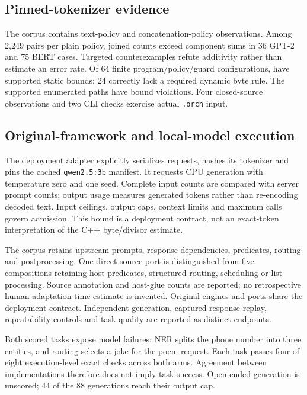 \documentclass[preprint,12pt,a4paper]{elsarticle}
\begin{document}
\subsection{Pinned-tokenizer evidence}
The corpus contains \revTokenizerTexts{} text-policy and
\revTokenizerConcats{} concatenation-policy observations. Among 2,249 pairs
per plain policy, joined counts exceed component sums in 36 GPT-2 and 75 BERT
cases. Targeted counterexamples refute additivity rather than estimate an error
rate. Of 64 finite program/policy/guard configurations,
\revExactSupported{} have supported static bounds; 24 correctly lack a
required dynamic byte rule. The \revExactPaths{} supported enumerated paths
have \revExactViolations{} bound violations. Four closed-source observations
and two CLI checks exercise actual \texttt{.orch} input.

\subsection{Original-framework and local-model execution}


The deployment adapter explicitly serializes requests, hashes its tokenizer
and pins the cached \texttt{qwen2.5:3b} manifest. It requests CPU generation
with temperature zero and one seed. Complete input counts are compared with
server prompt counts; output usage measures generated tokens rather than
re-encoding decoded text. Input ceilings, output caps, context limits and
maximum calls govern admission. This bound is a deployment contract, not an
exact-token interpretation of the C++ byte/divisor estimate.

The corpus retains upstream prompts, response dependencies, predicates,
routing and postprocessing. One direct source port is distinguished from five
compositions retaining host predicates, structured routing, scheduling or list
processing. Source annotation and host-glue counts are reported; no
retrospective human adaptation-time estimate is invented. Original engines
and ports share the deployment contract. Independent generation,
captured-response replay, repeatability controls and task quality are
reported as distinct endpoints.

Both scored tasks expose model failures: NER splits the phone number into
three entities, and routing selects a joke for the poem request. Each task
passes four of eight execution-level exact checks across both arms. Agreement
between implementations therefore does not imply task success. Open-ended
generation is unscored; 44 of the 88 generations reach their output cap.
\end{document}

